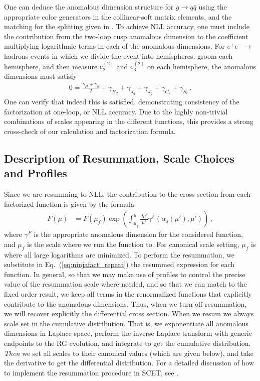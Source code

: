 \documentclass[a4paper,11pt]{article}
\newcommand{\ecf}[2]{e_{#1}^{(#2)}}
\DeclareRobustCommand{\Eq}[1]{Eq.~(\ref{#1})}
\begin{document}
One can deduce the anomalous dimension structure for $g\rightarrow q\bar{q}$ using the appropriate color generators in the collinear-soft matrix elements, and the matching for the splitting given in \cite{Larkoski:2015kga}. To achieve NLL accuracy, one must include the contribution from the two-loop cusp anomalous dimension to the coefficient multiplying logarithmic terms in each of the anomalous dimensions. For $e^+e^-\to $ hadrons events in which we divide the event into hemispheres, groom each hemisphere, and then measure $\ecf{2}{2}$ and $\ecf{3}{2}$ on each hemisphere, the anomalous dimensions must satisfy
\begin{align}
0= \frac{\gamma_H+\gamma_S}{2}+\gamma_{H_2}+\gamma_{J_q}+\gamma_{J_g}+\gamma_{C_s}+\gamma_{S_c}\,.
\end{align}
One can verify that indeed this is satisfied, demonstrating consistency of the factorization at one-loop, or NLL accuracy. Due to the highly non-trivial combinations of scales appearing in the different functions, this provides a strong cross-check of our calculation and factorization formula.

\subsection{Description of Resummation, Scale Choices and Profiles}\label{app:scales_resummation}

Since we are resumming to NLL, the contribution to the cross section from each factorized function is given by the formula
\begin{align}
F(\mu)&=F(\mu_f)\exp\left(\int^{\mu}_{\mu_f}\frac{d\mu'}{\mu'}\gamma^F(\alpha_s(\mu'),\mu')\right)\,,
\end{align}
where $\gamma^F$ is the appropriate anomalous dimension for the considered function, and $\mu_f$ is the scale where we run the function to. For canonical scale setting, $\mu_f$ is where all large logarithms are minimized. To perform the resummation, we substitute in \Eq{eq:ninjafact_repeat} the resummed expression for each function. In general, so that we may make use of profiles to control the precise value of the resummation scale where needed, and so that we can match to the fixed order result, we keep all terms in the renormalized functions that explicitly contribute to the anomalous dimensions. Thus, when we turn off resummation, we will recover explicitly the differential cross section. When we resum we always scale set in the cumulative distribution. That is, we exponentiate all anomalous dimensions in Laplace space, perform the inverse Laplace transform with generic endpoints to the RG evolution, and integrate to get the cumulative distribution. \emph{Then} we set all scales to their canonical values (which are given below), and take the derivative to get the differential distribution. For a detailed discussion of how to implement the resummation procedure in SCET, see \cite{Almeida:2014uva}. 
\end{document}
